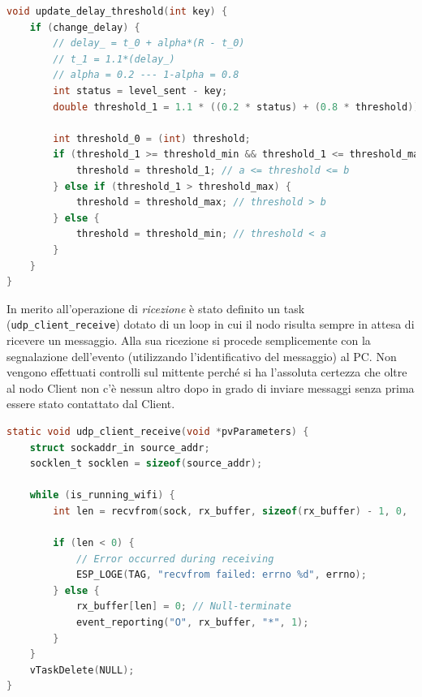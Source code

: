 \begin{lstlisting}[language=C, caption= aggiornamento del valore di soglia]
void update_delay_threshold(int key) {
    if (change_delay) {
        // delay_ = t_0 + alpha*(R - t_0)
        // t_1 = 1.1*(delay_)
        // alpha = 0.2 --- 1-alpha = 0.8
        int status = level_sent - key;
        double threshold_1 = 1.1 * ((0.2 * status) + (0.8 * threshold));

        int threshold_0 = (int) threshold;
        if (threshold_1 >= threshold_min && threshold_1 <= threshold_max) {
            threshold = threshold_1; // a <= threshold <= b
        } else if (threshold_1 > threshold_max) {
            threshold = threshold_max; // threshold > b
        } else {
            threshold = threshold_min; // threshold < a
        }
    }
}
\end{lstlisting}

\noindent In merito all'operazione di \textit{ricezione} è stato definito un task (\texttt{udp\_client\_receive}) dotato di un loop in cui il nodo risulta sempre in attesa di ricevere un messaggio. Alla sua ricezione si procede semplicemente con la segnalazione dell'evento (utilizzando l'identificativo del messaggio) al PC. Non vengono effettuati controlli sul mittente perché si ha l'assoluta certezza che oltre al nodo Client non c'è nessun altro dopo in grado di inviare messaggi senza prima essere stato contattato dal Client.\\

\begin{lstlisting}[language=C, caption= metodo di ricezione Wi-Fi]
static void udp_client_receive(void *pvParameters) {
    struct sockaddr_in source_addr;
    socklen_t socklen = sizeof(source_addr);

    while (is_running_wifi) {
        int len = recvfrom(sock, rx_buffer, sizeof(rx_buffer) - 1, 0, (struct sockaddr *) &source_addr, &socklen);

        if (len < 0) { 
            // Error occurred during receiving
            ESP_LOGE(TAG, "recvfrom failed: errno %d", errno);
        } else {
            rx_buffer[len] = 0; // Null-terminate
            event_reporting("O", rx_buffer, "*", 1);
        }
    }
    vTaskDelete(NULL);
}
\end{lstlisting}

